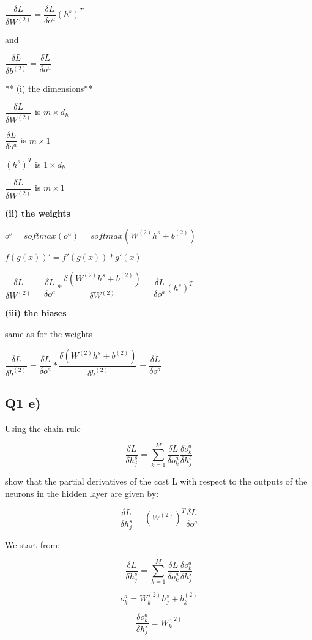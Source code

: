 \documentclass{article}
\begin{document}
$\dfrac {\delta  L} {\delta W^{(2)}} = \dfrac {\delta L} {\delta o^a} (h^s)^T $

and

$\dfrac {\delta  L} {\delta b^{(2)}} = \dfrac {\delta L} {\delta o^a} $

    ** (i) the dimensions**

$\dfrac {\delta  L} {\delta W^{(2)}}$ is $m \times d_h$

$\dfrac {\delta L} {\delta o^a}$ is $m \times 1$

$(h^s)^T$ is $1 \times d_h$

$\dfrac {\delta  L} {\delta W^{(2)}}$ is $m \times 1$

\textbf{(ii) the weights}

$o^s = softmax(o^a) = softmax(W^{(2)}h^s + b^{(2)})$

$f(g(x))' = f'(g(x)) * g'(x)$

$\dfrac {\delta  L} {\delta W^{(2)}} = \dfrac {\delta L} {\delta o^a} * \dfrac {\delta (W^{(2)}h^s + b^{(2)})} {\delta W^{(2)}} = \dfrac {\delta L} {\delta o^a} (h^s)^T $

\textbf{(iii) the biases}

same as for the weights

$\dfrac {\delta  L} {\delta b^{(2)}} = \dfrac {\delta L} {\delta o^a} * \dfrac {\delta (W^{(2)}h^s + b^{(2)})} {\delta b^{(2)}} = \dfrac {\delta L} {\delta o^a} $

    \subsection{Q1 e)}\label{q1-e}

    Using the chain rule

\[ \dfrac {\delta L} {\delta h^s_j} = \sum \limits_{k=1}^M \dfrac {\delta L} {\delta o^a_k} \dfrac {\delta o^a_k} {\delta h^s_j}\]

show that the partial derivatives of the cost L with respect to the
outputs of the neurons in the hidden layer are given by:

\[\dfrac {\delta L} {\delta h^s_j} = (W^{(2)})^T \dfrac {\delta L} {\delta o^a}\]

We start from:

\[ \dfrac {\delta L} {\delta h^s_j} = \sum \limits_{k=1}^M \dfrac {\delta L} {\delta o^a_k} \dfrac {\delta o^a_k} {\delta h^s_j}\]

\[ o^a_k = W^{(2)}_k h^s_j + b^{(2)}_k\]

\[ \dfrac {\delta o^a_k} {\delta h^s_j} = W^{(2)}_k \]
\end{document}

